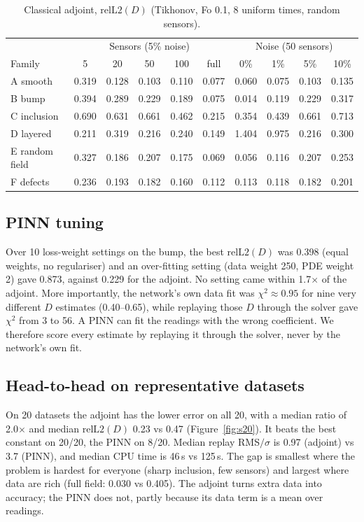 \documentclass[twoside,english]{article}
\newcommand{\relL}{\mathrm{relL2}(D)}
\begin{document}
\begin{table}[H]
\centering\footnotesize
\begin{tabular}{lccccc|cccc}
\toprule
& \multicolumn{5}{c|}{Sensors (5\% noise)} & \multicolumn{4}{c}{Noise (50 sensors)}\\
Family & 5 & 20 & 50 & 100 & full & 0\% & 1\% & 5\% & 10\% \\
\midrule
A smooth & 0.319 & 0.128 & 0.103 & 0.110 & 0.077 & 0.060 & 0.075 & 0.103 & 0.135 \\
B bump & 0.394 & 0.289 & 0.229 & 0.189 & 0.075 & 0.014 & 0.119 & 0.229 & 0.317\\
C inclusion & 0.690 & 0.631 & 0.661 & 0.462 & 0.215 & 0.354 & 0.439 & 0.661 & 0.713\\
D layered & 0.211 & 0.319 & 0.216 & 0.240 & 0.149 & 1.404 & 0.975 & 0.216 & 0.300\\
E random field & 0.327 & 0.186 & 0.207 & 0.175 & 0.069 & 0.056 & 0.116 & 0.207 & 0.253\\
F defects & 0.236 & 0.193 & 0.182 & 0.160 & 0.112 & 0.113 & 0.118 & 0.182 & 0.201\\
\bottomrule
\end{tabular}
\caption{Classical adjoint, $\relL$ (Tikhonov, Fo 0.1, 8 uniform times, random sensors).}\label{tab:classical}
\end{table}

\subsection{PINN tuning}
Over 10 loss-weight settings on the bump, the best $\relL$ was 0.398 (equal weights, no regulariser) and an over-fitting setting (data weight 250, PDE weight 2) gave 0.873, against 0.229 for the adjoint. No setting came within 1.7$\times$ of the adjoint. More importantly, the network's own data fit was $\chi^2\approx0.95$ for nine very different $D$ estimates (0.40--0.65), while replaying those $D$ through the solver gave $\chi^2$ from 3 to 56. A PINN can fit the readings with the wrong coefficient. We therefore score every estimate by replaying it through the solver, never by the network's own fit.

\subsection{Head-to-head on representative datasets}
On 20 datasets the adjoint has the lower error on all 20, with a median ratio of 2.0$\times$ and median $\relL$ 0.23 vs 0.47 (Figure~\ref{fig:s20}). It beats the best constant on 20/20, the PINN on 8/20. Median replay RMS$/\sigma$ is 0.97 (adjoint) vs 3.7 (PINN), and median CPU time is 46\,s vs 125\,s. The gap is smallest where the problem is hardest for everyone (sharp inclusion, few sensors) and largest where data are rich (full field: 0.030 vs 0.405). The adjoint turns extra data into accuracy; the PINN does not, partly because its data term is a mean over readings.
\end{document}
